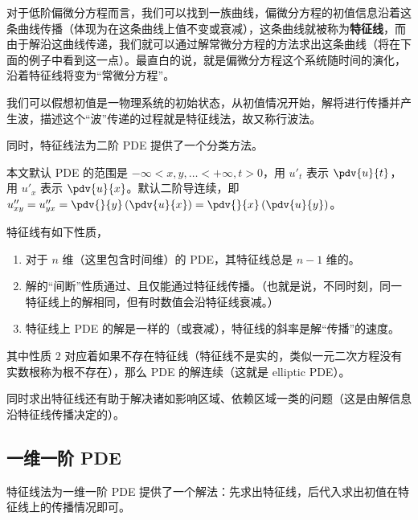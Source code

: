 
\begin{issues}
\issueTODO
{}
\end{issues}


对于低阶偏微分方程而言，我们可以找到一族曲线，偏微分方程的初值信息沿着这条曲线传播（体现为在这条曲线上值不变或衰减），这条曲线就被称为\textbf{特征线}，而由于解沿这曲线传递，我们就可以通过解常微分方程的方法求出这条曲线（将在下面的例子中看到这一点）。最直白的说，就是偏微分方程这个系统随时间的演化，沿着特征线将变为“常微分方程”。

我们可以假想初值是一物理系统的初始状态，从初值情况开始，解将进行传播并产生波，描述这个“波”传递的过程就是特征线法，故又称行波法。

同时，特征线法为二阶 PDE 提供了一个分类方法。

本文默认 PDE 的范围是 $-\infty < x, y, \dots < +\infty, t>0$，用 $u'_t$ 表示 $\pdv{u}{t}$，用 $u'_x$ 表示 $\pdv{u}{x}$。默认二阶导连续，即 $u''_{xy} = u''_{yx} = \pdv{}{y}\left(\pdv{u}{x}\right) = \pdv{}{x}\left(\pdv{u}{y}\right)$。

特征线有如下性质，
\begin{enumerate}
\item 对于 $n$ 维（这里包含时间维）的 PDE，其特征线总是 $n-1$ 维的。
\item 解的“间断”性质通过、且仅能通过特征线传播。（也就是说，不同时刻，同一特征线上的解相同，但有时数值会沿特征线衰减。）
\item 特征线上 PDE 的解是一样的（或衰减），特征线的斜率是解“传播”的速度。
\end{enumerate}
其中性质 $2$ 对应着如果不存在特征线（特征线不是实的，类似一元二次方程没有实数根称为根不存在），那么 PDE 的解连续（这就是 elliptic PDE）。

同时求出特征线还有助于解决诸如影响区域、依赖区域一类的问题（这是由解信息沿特征线传播决定的）。






\subsection{一维一阶 PDE}
特征线法为一维一阶 PDE 提供了一个解法：先求出特征线，后代入求出初值在特征线上的传播情况即可。

